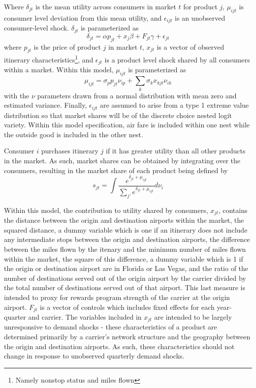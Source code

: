 \documentclass{article}
\begin{document}
	Where $\delta_{jt}$ is the mean utility across consumers in market $t$ for product $j$, $\mu_{ijt}$ is consumer level deviation from this mean utility, and $\epsilon_{ijt}$ is an unobserved consumer-level shock. $\delta_{jt}$ is parameterized as \[\delta_{jt} = \alpha p_{jt} + x_{j} \beta + F_{jt}\gamma  +  \epsilon_{jt}\] where $p_{jt}$ is the price of product $j$ in market $t$, $x_{jt}$ is a vector of observed itinerary characteristics\footnote{Namely nonstop status and miles flown}, and $\epsilon_{jt}$ is a product level shock shared by all consumers within a market. Within this model, $\mu_{ijt}$ is parameterized as \[\mu_{ijt} = \sigma_{p} p_{jt} \nu_{ip} + \sum_{k} \sigma_{k} x_{kjt} \nu_{ik} \] with the $\nu$ parameters drawn from a  normal distribution with mean zero and estimated variance. Finally, $\epsilon_{ijt}$ are assumed to arise from a type 1 extreme value distribution so that market shares will be of the discrete choice nested logit variety. Within this model specification, air fare is included within one nest while the outside good is included in the other nest.
	
	Consumer $i$ purchases itinerary $j$ if it has greater utility than all other products in the market. As such, market shares can be obtained by integrating over the consumers, resulting in the market share of each product being defined by \[s_{jt} = \int \frac{e^{\delta_{jt} + \mu_{ijt}}}{\sum_{j'} e^{\delta_{jt} + \mu_{ijt}}} d{\nu_{i}}\]
	
	Within this model, the contribution to utility shared by consumers, $x_{jt}$, contains the distance between the origin and destination airports within the market, the squared distance, a dummy variable which is one if an itinerary does not include any intermediate stops between the origin and destination airports, the difference between the miles flown by the itenary and the minimum number of miles flown within the market, the square of this difference, a dummy variable which is 1 if the origin or destination airport are in Florida or Las Vegas, and the ratio of the number of destinations served out of the origin airport by the carrier divided by the total number of destinations served out of that airport. This last measure is intended to proxy for rewards program strength of the carrier at the origin airport. $F_{jt}$ is a vector of controls which includes fixed effects for each year-quarter and carrier. The variables included in $x_{jt}$ are intended to be largely unresponsive to demand shocks - these characteristics of a product are determined primarily by a carrier's network structure and the geography between the origin and destination airports. As such, these characteristics should not change in response to unobserved quarterly demand shocks.
	
\end{document}
